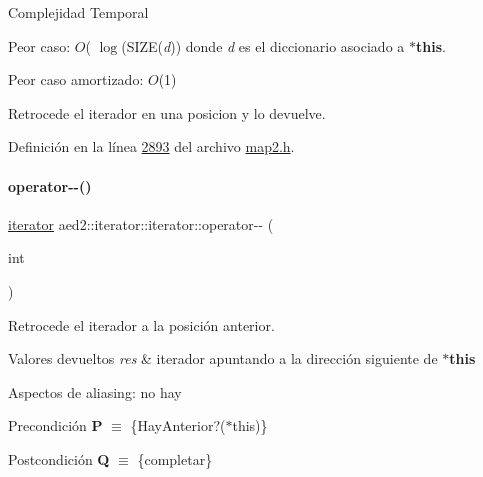 \begin{DoxyDescription}
\item[Complejidad Temporal]
\begin{DoxyItemize}
\item Peor caso\+: $O$( $\log$(S\+I\+ZE({\itshape d})) donde {\itshape d} es el diccionario asociado a {\bfseries $\ast$this}.
\item Peor caso amortizado\+: $O$(1) 
\end{DoxyItemize}
\end{DoxyDescription}

Retrocede el iterador en una posicion y lo devuelve. 

Definición en la línea \hyperlink{map2_8h_source_l02893}{2893} del archivo \hyperlink{map2_8h_source}{map2.\+h}.

\mbox{\label{classaed2_1_1iterator_1_1iterator_a6bd61026c75767d0d41e45229144e9d0_a6bd61026c75767d0d41e45229144e9d0}} 
\paragraph{\texorpdfstring{operator-\/-\/()}{operator--()}\hspace{0.1cm}{\footnotesize\ttfamily [2/2]}}
{\footnotesize\ttfamily \hyperlink{classaed2_1_1iterator_1_1iterator}{iterator} aed2\+::iterator\+::iterator\+::operator-\/-\/ (\begin{DoxyParamCaption}\item[{int}]{ }\end{DoxyParamCaption})\hspace{0.3cm}{\ttfamily [inline]}}



Retrocede el iterador a la posición anterior. 


\begin{DoxyRetVals}{Valores devueltos}
{\em res} & iterador apuntando a la dirección siguiente de {\bfseries $\ast$this}\\
\hline
\end{DoxyRetVals}
\begin{DoxyParagraph}{Aspectos de aliasing\+:}
no hay
\end{DoxyParagraph}
\begin{DoxyPrecond}{Precondición}
{\bfseries P} $\equiv$ \{Hay\+Anterior?($\ast$this)\} 
\end{DoxyPrecond}
\begin{DoxyPostcond}{Postcondición}
{\bfseries Q} $\equiv$ \{completar\}
\end{DoxyPostcond}

